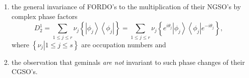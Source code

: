 \documentclass[aps,preprint]{revtex4}%
\begin{document}
\begin{enumerate}
\item the general invariance of FORDO's to the multiplication of their NGSO's
by complex phase factors
\begin{equation}
D_{2}^{1}=\sum_{1\leq j\leq r}\nu_{j}\left\{  \left\vert \phi_{j}\right\rangle
\left\langle \phi_{j}\right\vert \right\}  =\sum_{1\leq j\leq r}\nu
_{j}\left\{  e^{i\theta_{j}}\left\vert \phi_{j}\right\rangle \left\langle
\phi_{j}\right\vert e^{-i\theta_{j}}\right\}  ,
\end{equation}
where $\left\{  \left.  \nu_{j}\right\vert 1\leq j\leq s\right\}  $ are
occupation numbers and

\item the observation that geminals \emph{are not }invariant to such phase
changes of their CGSO's.
\end{enumerate}
\end{document}
